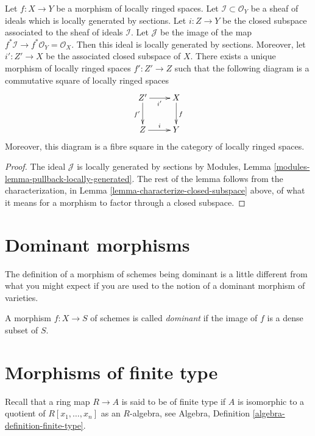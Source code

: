 \begin{lemma}
\label{lemma-restrict-map-to-closed}
Let $f : X \to Y$ be a morphism of locally ringed spaces.
Let $\mathcal{I} \subset \mathcal{O}_Y$ be a sheaf of
ideals which is locally generated by sections.
Let $i : Z \to Y$ be the closed subspace associated to the
sheaf of ideals $\mathcal{I}$.
Let $\mathcal{J}$ be the image of the map
$f^*\mathcal{I} \to f^*\mathcal{O}_Y = \mathcal{O}_X$.
Then this ideal is locally generated by sections.
Moreover, let $i' : Z' \to X$ be the associated closed
subspace of $X$. There exists a unique
morphism of locally ringed spaces $f' : Z' \to Z$ such
that the following diagram is a commutative square of
locally ringed spaces
$$
\xymatrix{
Z' \ar[d]_{f'} \ar[r]_{i'} & X \ar[d]^f \\
Z \ar[r]^{i} & Y
}
$$
Moreover, this diagram is a fibre square in the category of
locally ringed spaces.
\end{lemma}

\begin{proof}
The ideal $\mathcal{J}$ is locally generated by sections
by Modules, Lemma \ref{modules-lemma-pullback-locally-generated}.
The rest of the lemma follows from the characterization,
in Lemma \ref{lemma-characterize-closed-subspace} above,
of what it means for a morphism to factor through a closed
subspace.
\end{proof}

\section{Dominant morphisms}
\label{section-dominant}

\noindent
The definition of a morphism of schemes being dominant is a little
different from what you might expect if you are used to the notion
of a dominant morphism of varieties.

\begin{definition}
\label{definition-dominant}
A morphism $f : X \to S$ of schemes is called {\it dominant} if the
image of $f$ is a dense subset of $S$.
\end{definition}

\section{Morphisms of finite type}
\label{section-finite-type}

\noindent
Recall that a ring map $R \to A$ is said to be of finite type if
$A$ is isomorphic to a quotient of $R[x_1, \ldots, x_n]$ as an $R$-algebra, see
Algebra, Definition \ref{algebra-definition-finite-type}.

